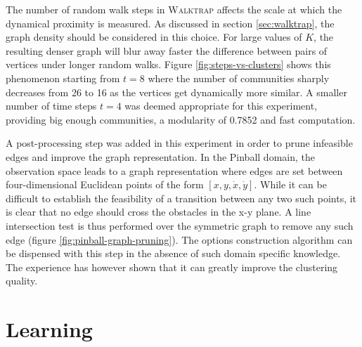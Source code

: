 The number of random walk steps in \textsc{Walktrap} affects the scale at which the dynamical proximity is measured. As discussed in section \ref{sec:walktrap}, the graph density should be considered in this choice. For large values of $K$, the resulting denser graph will blur away faster the difference between pairs of vertices under longer random walks. Figure \ref{fig:steps-vs-clusters} shows this phenomenon starting from $t=8$ where the number of communities sharply decreases from 26 to 16 as the vertices get dynamically more similar. A smaller number of time steps $t=4$ was deemed appropriate for this experiment, providing big enough communities, a modularity of 0.7852 and fast computation.

A post-processing step was added in this experiment in order to prune infeasible edges and improve the graph representation. In the Pinball domain, the observation space leads to a graph representation where edges are set between four-dimensional Euclidean points of the form $[x, y, \dot{x}, \dot{y}]$. While it can be difficult to establish the feasibility of a transition between any two such points, it is clear that no edge should cross the obstacles in the x-y plane. A line intersection test is thus performed over the symmetric graph to remove any such edge (figure \ref{fig:pinball-graph-pruning}). The options construction algorithm can be dispensed with this step in the absence of such domain specific knowledge. The experience has however shown that it can greatly improve the clustering quality.

\section{Learning}

